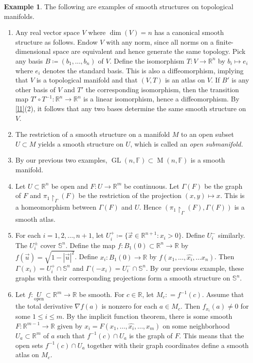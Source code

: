 \documentclass[10pt,letterpaper,cm]{nupset}
\theoremstyle{definition}
\newtheorem{exmp}[definition]{Example}
\theoremstyle{theorem}
\theoremstyle{remark}
\newcommand{\F}{\mathbb F}
\newcommand{\R}{\mathbb R}
\renewcommand{\S}{\mathbb S}
\newcommand{\1}{\mathbf{1}}
\renewcommand{\u}{\vec u}
\newcommand{\x}{\vec x}
\newcommand{\0}{\vec 0}
\DeclareMathOperator{\GL}{GL}
\DeclareMathOperator{\M}{M}
\begin{document}
\begin{exmp}{The following are examples of smooth structures on topological manifolds.}
\begin{enumerate}
\item Any real vector space $V$ where $\dim(V) = n$ has a canonical smooth structure as follows. Endow $V$ with any norm, since all norms on a finite-dimensional space are equivalent and hence generate the same topology. Pick any basis $B\coloneqq  (b_1, \ldots, b_n)$ of $V$.  Define the isomorphism  $T: V \to \R^n$ by $b_i \mapsto e_i$ where $e_i$ denotes the standard basis. This is also a diffeomorphism, implying that $V$ is a topological manifold and that $(V, T)$ is an atlas on $V$. If $B'$ is any other basis of $V$ and $T'$ the corresponding isomorphism, then the transition map $T' \circ T^{-1}: \R^n \to \R^n$ is a linear isomorphism, hence a diffeomorphism. By \cref{l1}(2), it follows that any two bases determine the same smooth structure on $V$. 
\item The restriction of a smooth structure on  a manifold $M$ to an open subset $U \subset M$ yields a smooth structure on $U$, which is called an \textit{open submanifold.} 
\item By our previous two examples, $\GL(n, \F) \subset \M(n, \F)$ is a smooth manifold.
\item Let $U\subset \R^n$ be open and $F: U \to \R^m$ be continuous. Let $\Gamma(F)$ be the graph of $F$ and $\pi_1\restriction_\Gamma(F)$ be the restriction of the projection $(x, y)\mapsto x$. This is a homeomorphism between $\Gamma(F)$ and $U$. Hence $(\pi_1 \restriction_\Gamma(F), \Gamma(F))$ is a smooth atlas.
\item For each $i = 1, 2, \ldots, n+1$, let $U_i^+ \coloneqq  \{ \x \in \R^{n+1}: x_i >0\}$. Define $U_i^-$ similarly. The $U_i^{\pm}$ cover $\S^n$. Define the map $f: B_1(0)\subset \R^n \to \R$ by $f(\u) = \sqrt{1 - |\u|^2}$. Define $x_i: B_1(0) \to \R$ by $f(x_1, \ldots, \widehat{x_i}, \ldots x_n)$.  Then $\Gamma(x_i) = U_i^+ \cap \S^n$ and $\Gamma(-x_i) = U_i^- \cap \S^n$. By our previous example, these graphs with their corresponding projections form a smooth structure on $\S^n$.
\item Let $f: \underset{\text{open}}U\subset \R^m \to \R$ be smooth. For $c \in \R$, let $M_c: = f^{-1}(c)$. Assume that the total derivative $\nabla f(a)$ is nonzero for each $a \in M_c$.  Then $f_{x_i}(a) \ne 0$ for some $1 \leq i \leq m$. By the implicit function theorem, there is some smooth $F: \R^{m-1} \to \R$ given by $x_i = F(x_1, \ldots, \widehat{x_i}, \ldots, x_m)$ on some neighborhood $U_a\subset \R^m$ of $a$ such that $f^{-1}(c) \cap U_a$ is the graph of $F$.  This means that the open sets $f^{-1}(c) \cap U_a$ together with their graph coordinates define a smooth atlas on $M_c$.

\end{enumerate}
\end{exmp}
\end{document}
